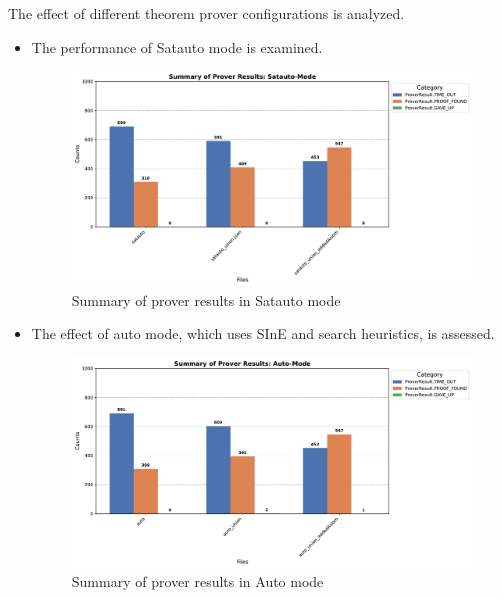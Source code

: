 \documentclass[english,version-2020-11]{uzl-thesis}
\begin{document}
The effect of different theorem prover configurations is analyzed.

\begin{itemize}
    \item The performance of Satauto mode is examined.
    \begin{figure}[h!]
        \centering
        \includegraphics[width=\textwidth]{satauto_mode_output.pdf}
        \caption{Summary of prover results in Satauto mode}
        \label{fig:prover_results_satauto}
    \end{figure}
    \FloatBarrier

    \item The effect of auto mode, which uses SInE and search heuristics, is assessed.
    \begin{figure}[h!]
        \centering
        \includegraphics[width=\textwidth]{auto_mode_output.pdf}
        \caption{Summary of prover results in Auto mode}
        \label{fig:prover_results_auto}
    \end{figure}
    \FloatBarrier
\end{itemize}

\end{document}
